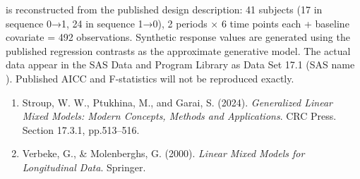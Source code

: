 \documentclass[a4paper]{book}
\begin{document}
%
\begin{Note}
  is reconstructed from the
published design description: 41 subjects (17 in sequence 0→1, 24 in
sequence 1→0), 2 periods × 6 time points each + baseline covariate =
492 observations.  Synthetic response values are generated using the
published regression contrasts as the approximate generative model.
The actual data appear in the SAS Data and Program Library as Data Set 17.1
(SAS name ).  Published AICC and F-statistics will
not be reproduced exactly.
\end{Note}
%
\begin{References}
\begin{enumerate}

\item{} Stroup, W. W., Ptukhina, M., and Garai, S. (2024).
\emph{Generalized Linear Mixed Models: Modern Concepts, Methods and
Applications}. CRC Press. Section 17.3.1, pp.513–516.
\item{} Verbeke, G., \& Molenberghs, G. (2000).
\emph{Linear Mixed Models for Longitudinal Data}. Springer.

\end{enumerate}

\end{References}
%
\begin{SeeAlso}
\end{SeeAlso}
%
\end{document}
